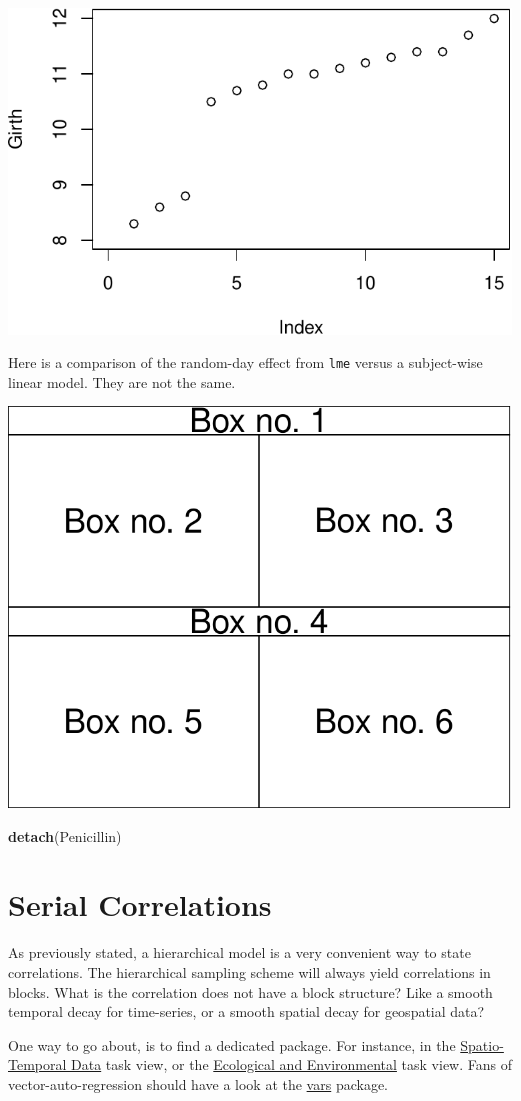 \documentclass[]{book}
\newenvironment{Shaded}{\begin{snugshade}}{\end{snugshade}}
\newcommand{\KeywordTok}[1]{\textcolor[rgb]{0.13,0.29,0.53}{\textbf{#1}}}
\newcommand{\NormalTok}[1]{#1}
\theoremstyle{definition}
\theoremstyle{definition}
\theoremstyle{definition}
\theoremstyle{remark}
\begin{document}
\includegraphics[width=0.5\linewidth]{Rcourse_files/figure-latex/unnamed-chunk-214-1}

Here is a comparison of the random-day effect from \texttt{lme} versus a
subject-wise linear model. They are not the same.

\includegraphics[width=0.5\linewidth]{Rcourse_files/figure-latex/unnamed-chunk-215-1}

\begin{Shaded}
\begin{Highlighting}[]
\KeywordTok{detach}\NormalTok{(Penicillin)}
\end{Highlighting}
\end{Shaded}

\section{Serial Correlations}\label{serial}

As previously stated, a hierarchical model is a very convenient way to
state correlations. The hierarchical sampling scheme will always yield
correlations in blocks. What is the correlation does not have a block
structure? Like a smooth temporal decay for time-series, or a smooth
spatial decay for geospatial data?

One way to go about, is to find a dedicated package. For instance, in
the
\href{https://cran.r-project.org/web/views/SpatioTemporal.html}{Spatio-Temporal
Data} task view, or the
\href{https://cran.r-project.org/web/views/Environmetrics.html}{Ecological
and Environmental} task view. Fans of vector-auto-regression should have
a look at the \href{https://cran.r-project.org/package=vars}{vars}
package.
\end{document}
